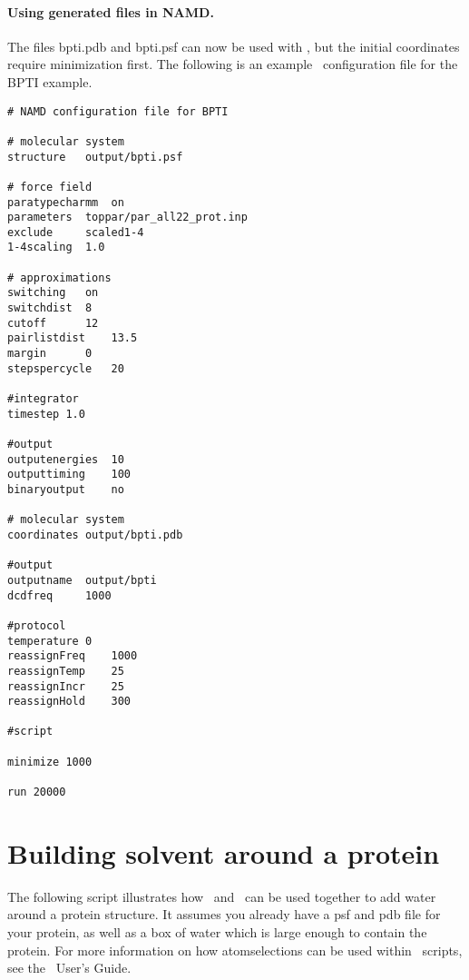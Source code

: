 \paragraph*{Using generated files in NAMD.}

The files bpti.pdb and bpti.psf can now be used with \NAMD, but the
initial coordinates require minimization first.
The following is an example \NAMD\ configuration file for the BPTI example.

\begin{verbatim}
# NAMD configuration file for BPTI

# molecular system
structure	output/bpti.psf

# force field
paratypecharmm	on
parameters	toppar/par_all22_prot.inp
exclude		scaled1-4
1-4scaling	1.0

# approximations
switching	on
switchdist	8
cutoff		12
pairlistdist	13.5
margin		0
stepspercycle	20

#integrator
timestep 1.0

#output
outputenergies	10
outputtiming	100
binaryoutput	no

# molecular system
coordinates	output/bpti.pdb

#output
outputname	output/bpti
dcdfreq		1000

#protocol
temperature	0
reassignFreq	1000
reassignTemp	25
reassignIncr	25
reassignHold	300

#script

minimize 1000

run 20000
\end{verbatim}

\section{Building solvent around a protein}
The following script illustrates how \PSFGEN\ and \VMD\ can be used together
to add water around a protein structure.  It assumes you already have a 
psf and pdb file for your protein, as well as a box of water which is 
large enough to contain the protein. For more information on how atomselections
can be used within \VMD\ scripts, see the \VMD\ User's Guide.

